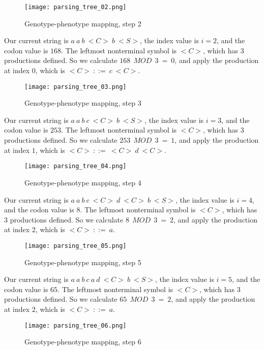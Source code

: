 \begin{figure}[H]
	\centering
	\texttt{[image: parsing\_tree\_02.png]}
	\caption{Genotype-phenotype mapping, step 2}
\end{figure}

Our current string is $a\:a\:b\:{<}C{>}\:b\:{<}S{>}$, the index value is $i = 2$, and the codon value is $168$. The leftmost nonterminal symbol is ${<}C{>}$, which has $3$ productions defined. So we calculate $168\:\:MOD\:\:3\:=\:0$, and apply the production at index $0$, which is ${<}C{>}\:::=\:c\:{<}C{>}$.

\begin{figure}[H]
	\centering
	\texttt{[image: parsing\_tree\_03.png]}
	\caption{Genotype-phenotype mapping, step 3}
\end{figure}

Our current string is $a\:a\:b\:c\:{<}C{>}\:b\:{<}S{>}$, the index value is $i = 3$, and the codon value is $253$. The leftmost nonterminal symbol is ${<}C{>}$, which has $3$ productions defined. So we calculate $253\:\:MOD\:\:3\:=\:1$, and apply the production at index $1$, which is ${<}C{>}\:::=\:{<}C{>}\:d\:{<}C{>}$.

\begin{figure}[H]
	\centering
	\texttt{[image: parsing\_tree\_04.png]}
	\caption{Genotype-phenotype mapping, step 4}
\end{figure}

Our current string is $a\:a\:b\:c\:{<}C{>}\:d\:{<}C{>}\:b\:{<}S{>}$, the index value is $i = 4$, and the codon value is $8$. The leftmost nonterminal symbol is ${<}C{>}$, which has $3$ productions defined. So we calculate $8\:\:MOD\:\:3\:=\:2$, and apply the production at index $2$, which is ${<}C{>}\:::=\:a$.

\begin{figure}[H]
	\centering
	\texttt{[image: parsing\_tree\_05.png]}
	\caption{Genotype-phenotype mapping, step 5}
\end{figure}

Our current string is $a\:a\:b\:c\:a\:d\:{<}C{>}\:b\:{<}S{>}$, the index value is $i = 5$, and the codon value is $65$. The leftmost nonterminal symbol is ${<}C{>}$, which has $3$ productions defined. So we calculate $65\:\:MOD\:\:3\:=\:2$, and apply the production at index $2$, which is ${<}C{>}\:::=\:a$.

\begin{figure}[H]
	\centering
	\texttt{[image: parsing\_tree\_06.png]}
	\caption{Genotype-phenotype mapping, step 6}
\end{figure}

